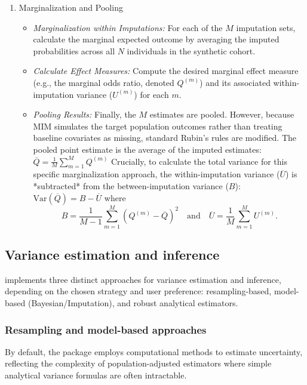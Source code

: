 \documentclass[article]{jss}
\begin{document}
\begin{enumerate}
\item Marginalization and Pooling
\begin{itemize}
    \item \emph{Marginalization within Imputations:} For each of the $M$ imputation sets, calculate the marginal expected outcome by averaging the imputed probabilities across all $N$ individuals in the synthetic cohort. 
    \item \emph{Calculate Effect Measures:} Compute the desired marginal effect measure (e.g., the marginal odds ratio, denoted $Q^{(m)}$) and its associated within-imputation variance ($U^{(m)}$) for each $m$.
    \item \emph{Pooling Results:} Finally, the $M$ estimates are pooled. However, because MIM simulates the target population outcomes rather than treating baseline covariates as missing, standard Rubin's rules are modified. The pooled point estimate is the average of the imputed estimates:
   $\overline{Q} = \frac{1}{M}\sum_{m=1}^{M}Q^{(m)}$
   Crucially, to calculate the total variance for this specific marginalization approach, the within-imputation variance ($\overline{U}$) is *subtracted* from the between-imputation variance ($B$):
   $\text{Var}(\overline{Q}) = B - \overline{U}$
   where 
   $$
   B = \frac{1}{M-1}\sum_{m=1}^{M}(Q^{(m)} - \overline{Q})^2 \quad \text{and} \quad \overline{U} = \frac{1}{M}\sum_{m=1}^{M}U^{(m)}.
   $$
\end{itemize}
\end{enumerate}

\subsection{Variance estimation and inference}

 implements three distinct approaches for variance estimation and inference, depending on the chosen strategy and user preference: resampling-based, model-based (Bayesian/Imputation), and robust analytical estimators.

\subsubsection{Resampling and model-based approaches}

By default, the package employs computational methods to estimate uncertainty, reflecting the complexity of population-adjusted estimators where simple analytical variance formulas are often intractable.
\end{document}
